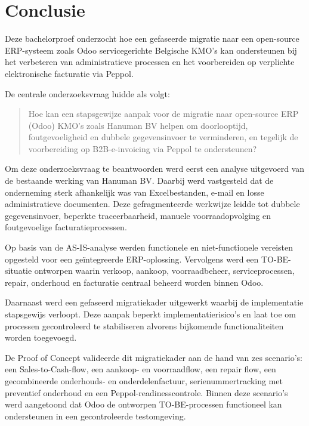 
\chapter{Conclusie}%
\label{ch:conclusie}

Deze bachelorproef onderzocht hoe een gefaseerde migratie naar een open-source ERP-systeem zoals Odoo servicegerichte Belgische KMO's kan ondersteunen bij het verbeteren van administratieve processen en het voorbereiden op verplichte elektronische facturatie via Peppol.

De centrale onderzoeksvraag luidde als volgt:

\begin{quote}
Hoe kan een stapsgewijze aanpak voor de migratie naar open-source ERP (Odoo) KMO's zoals Hanuman BV helpen om doorlooptijd, foutgevoeligheid en dubbele gegevensinvoer te verminderen, en tegelijk de voorbereiding op B2B-e-invoicing via Peppol te ondersteunen?
\end{quote}

Om deze onderzoeksvraag te beantwoorden werd eerst een analyse uitgevoerd van de bestaande werking van Hanuman BV. Daarbij werd vastgesteld dat de onderneming sterk afhankelijk was van Excelbestanden, e-mail en losse administratieve documenten. Deze gefragmenteerde werkwijze leidde tot dubbele gegevensinvoer, beperkte traceerbaarheid, manuele voorraadopvolging en foutgevoelige facturatieprocessen.

Op basis van de AS-IS-analyse werden functionele en niet-functionele vereisten opgesteld voor een geïntegreerde ERP-oplossing. Vervolgens werd een TO-BE-situatie ontworpen waarin verkoop, aankoop, voorraadbeheer, serviceprocessen, repair, onderhoud en facturatie centraal beheerd worden binnen Odoo.

Daarnaast werd een gefaseerd migratiekader uitgewerkt waarbij de implementatie stapsgewijs verloopt. Deze aanpak beperkt implementatierisico's en laat toe om processen gecontroleerd te stabiliseren alvorens bijkomende functionaliteiten worden toegevoegd.

De Proof of Concept valideerde dit migratiekader aan de hand van zes scenario's: een Sales-to-Cash-flow, een aankoop- en voorraadflow, een repair flow, een gecombineerde onderhouds- en onderdelenfactuur, serienummertracking met preventief onderhoud en een Peppol-readinesscontrole. Binnen deze scenario's werd aangetoond dat Odoo de ontworpen TO-BE-processen functioneel kan ondersteunen in een gecontroleerde testomgeving.

